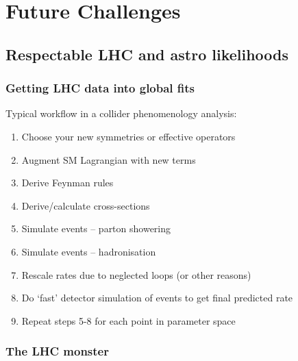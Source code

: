 \documentclass[xcolor=dvipsnames]{beamer}
\begin{document}
\section{Future Challenges}

\subsection{Respectable LHC and astro likelihoods}

\begin{frame}
\frametitle{Getting LHC data into global fits}

Typical workflow in a collider phenomenology analysis:

\begin{enumerate}
\item Choose your new symmetries or effective operators
\item Augment SM Lagrangian with new terms
\item Derive Feynman rules
\item Derive/calculate cross-sections
\item Simulate events -- parton showering
\item Simulate events -- hadronisation
\item Rescale rates due to neglected loops (or other reasons)
\item Do `fast' detector simulation of events to get final predicted rate
\item Repeat steps 5-8 for each point in parameter space
\end{enumerate}

\end{frame}

\begin{frame}
\frametitle{The LHC monster}




\end{frame}
\end{document}
